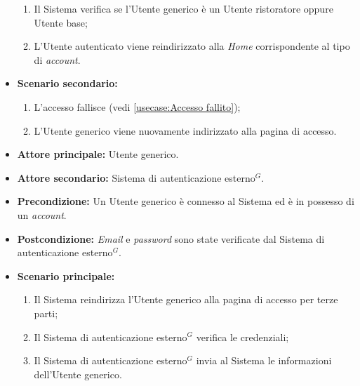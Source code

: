 \begin{itemize}
\begin{enumerate}
		      \item Il Sistema verifica se l'Utente generico è un Utente ristoratore oppure Utente base;
		      \item L'Utente autenticato viene reindirizzato alla \textit{Home} corrispondente al tipo di \textit{account}.
	      \end{enumerate}
		
	\item \textbf{Scenario secondario:}
		\begin{enumerate}
			\item L'accesso fallisce (vedi \autoref{usecase:Accesso fallito});
			\item L'Utente generico viene nuovamente indirizzato alla pagina di accesso.
		\end{enumerate}	
	\end{itemize}

\label{usecase:Accesso per terze parti}
\begin{itemize}

	\item \textbf{Attore principale:} Utente generico.
	\item \textbf{Attore secondario:} Sistema di autenticazione esterno$^G$.

	\item \textbf{Precondizione:} Un Utente generico è connesso al Sistema ed è in possesso di un \textit{account}.

	\item \textbf{Postcondizione:} \textit{Email} e \textit{password} sono state verificate dal Sistema di autenticazione esterno$^G$.


	\item \textbf{Scenario principale:}
	\begin{enumerate}
		\item Il Sistema reindirizza l'Utente generico alla pagina di accesso per terze parti;
		\item Il Sistema di autenticazione esterno$^G$ verifica le credenziali;
		\item Il Sistema di autenticazione esterno$^G$ invia al Sistema le informazioni dell'Utente generico.
	\end{enumerate}
	
\end{itemize}

